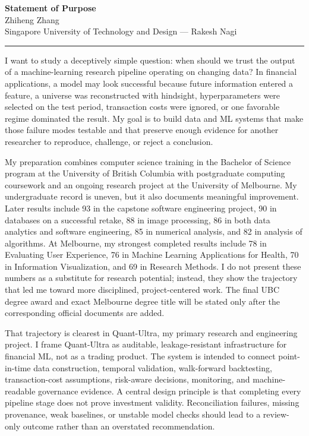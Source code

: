 \documentclass[11pt]{article}
\newcommand{\ApplicantName}{Zhiheng Zhang}
\begin{document}
\begin{center}
{\LARGE\bfseries Statement of Purpose}\\[0.25em]
{\large \ApplicantName}\\
Singapore University of Technology and Design --- Rakesh Nagi
\end{center}
\vspace{0.35em}\hrule\vspace{0.65em}

I want to study a deceptively simple question: when should we trust the output of a machine-learning research pipeline operating on changing data? In financial applications, a model may look successful because future information entered a feature, a universe was reconstructed with hindsight, hyperparameters were selected on the test period, transaction costs were ignored, or one favorable regime dominated the result. My goal is to build data and ML systems that make those failure modes testable and that preserve enough evidence for another researcher to reproduce, challenge, or reject a conclusion.

My preparation combines computer science training in the Bachelor of Science program at the University of British Columbia with postgraduate computing coursework and an ongoing research project at the University of Melbourne. My undergraduate record is uneven, but it also documents meaningful improvement. Later results include 93 in the capstone software engineering project, 90 in databases on a successful retake, 88 in image processing, 86 in both data analytics and software engineering, 85 in numerical analysis, and 82 in analysis of algorithms. At Melbourne, my strongest completed results include 78 in Evaluating User Experience, 76 in Machine Learning Applications for Health, 70 in Information Visualization, and 69 in Research Methods. I do not present these numbers as a substitute for research potential; instead, they show the trajectory that led me toward more disciplined, project-centered work. The final UBC degree award and exact Melbourne degree title will be stated only after the corresponding official documents are added.

That trajectory is clearest in Quant-Ultra, my primary research and engineering project. I frame Quant-Ultra as auditable, leakage-resistant infrastructure for financial ML, not as a trading product. The system is intended to connect point-in-time data construction, temporal validation, walk-forward backtesting, transaction-cost assumptions, risk-aware decisions, monitoring, and machine-readable governance evidence. A central design principle is that completing every pipeline stage does not prove investment validity. Reconciliation failures, missing provenance, weak baselines, or unstable model checks should lead to a review-only outcome rather than an overstated recommendation.
\end{document}

